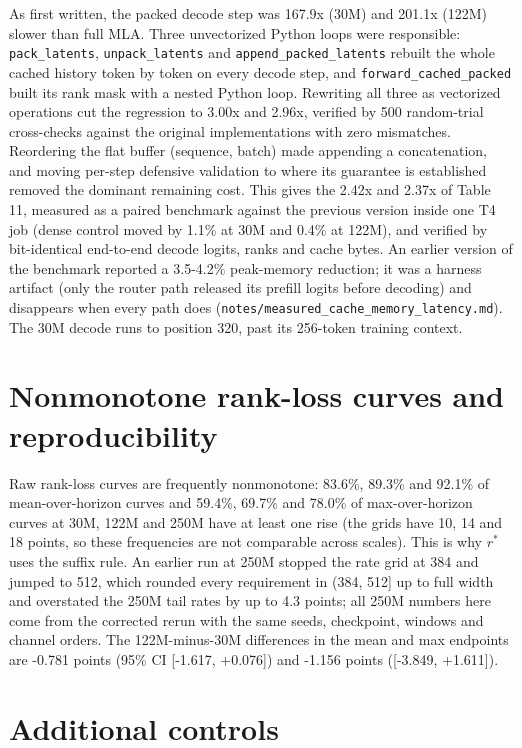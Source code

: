 \documentclass[10pt]{article}
\begin{document}
As first written, the packed decode step was 167.9x (30M) and 201.1x (122M) slower than full MLA. Three unvectorized Python loops were responsible: \texttt{pack\_latents}, \texttt{unpack\_latents} and \texttt{append\_packed\_latents} rebuilt the whole cached history token by token on every decode step, and \texttt{forward\_cached\_packed} built its rank mask with a nested Python loop. Rewriting all three as vectorized operations cut the regression to 3.00x and 2.96x, verified by 500 random-trial cross-checks against the original implementations with zero mismatches. Reordering the flat buffer (sequence, batch) made appending a concatenation, and moving per-step defensive validation to where its guarantee is established removed the dominant remaining cost. This gives the 2.42x and 2.37x of Table 11, measured as a paired benchmark against the previous version inside one T4 job (dense control moved by 1.1\% at 30M and 0.4\% at 122M), and verified by bit-identical end-to-end decode logits, ranks and cache bytes. An earlier version of the benchmark reported a 3.5-4.2\% peak-memory reduction; it was a harness artifact (only the router path released its prefill logits before decoding) and disappears when every path does (\texttt{notes/\allowbreak measured\_cache\_memory\_latency.md}). The 30M decode runs to position 320, past its 256-token training context.

\section{Nonmonotone rank-loss curves and reproducibility}

Raw rank-loss curves are frequently nonmonotone: 83.6\%, 89.3\% and 92.1\% of mean-over-horizon curves and 59.4\%, 69.7\% and 78.0\% of max-over-horizon curves at 30M, 122M and 250M have at least one rise (the grids have 10, 14 and 18 points, so these frequencies are not comparable across scales). This is why $r^*$ uses the suffix rule. An earlier run at 250M stopped the rate grid at 384 and jumped to 512, which rounded every requirement in (384, 512] up to full width and overstated the 250M tail rates by up to 4.3 points; all 250M numbers here come from the corrected rerun with the same seeds, checkpoint, windows and channel orders. The 122M-minus-30M differences in the mean and max endpoints are -0.781 points (95\% CI [-1.617, +0.076]) and -1.156 points ([-3.849, +1.611]).

\section{Additional controls}
\end{document}
